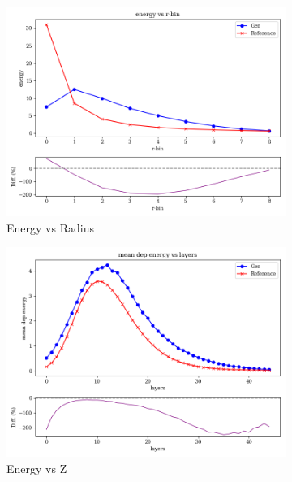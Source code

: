 \begin{figure}
    \centering
    \begin{subfigure}[b]{0.3\textwidth}
        \centering
        \includegraphics[width=\textwidth]{Figures/exponential2.png}
        \caption{Energy vs Radius}
        \label{fig:exp2}
    \end{subfigure}
    \hfill
    \begin{subfigure}[b]{0.3\textwidth}
        \centering
        \includegraphics[width=\textwidth]{Figures/exponential3.png}
        \caption{Energy vs Z}
        \label{fig:exp3}
    \end{subfigure}
    \hfill
    \begin{subfigure}[b]{0.3\textwidth}

\end{subfigure}
\end{figure}
